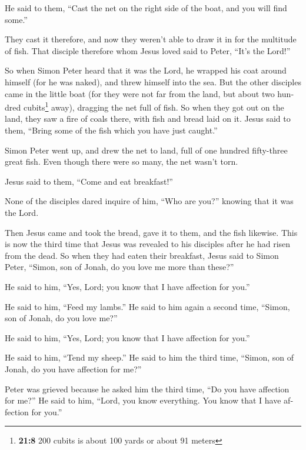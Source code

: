 \begin{paracol}{2}
\begin{otherlanguage}{english}
 He said to them, ``Cast the net on the right side of the
boat, and you will find some.''

They cast it therefore, and now they weren't able to draw it in for the
multitude of fish.  That disciple therefore whom Jesus
loved said to Peter, ``It's the Lord!''

So when Simon Peter heard that it was the Lord, he wrapped his coat
around himself (for he was naked), and threw himself into the sea.
 But the other disciples came in the little boat (for they
were not far from the land, but about two hundred cubits\footnote{\textbf{21:8}
  200 cubits is about 100 yards or about 91 meters} away), dragging the
net full of fish.  So when they got out on the land, they
saw a fire of coals there, with fish and bread laid on it.
 Jesus said to them, ``Bring some of the fish which you
have just caught.''

 Simon Peter went up, and drew the net to land, full of
one hundred fifty-three great fish. Even though there were so many, the
net wasn't torn.

 Jesus said to them, ``Come and eat breakfast!''

None of the disciples dared inquire of him, ``Who are you?'' knowing
that it was the Lord.

 Then Jesus came and took the bread, gave it to them, and
the fish likewise.  This is now the third time that Jesus
was revealed to his disciples after he had risen from the dead.
 So when they had eaten their breakfast, Jesus said to
Simon Peter, ``Simon, son of Jonah, do you love me more than these?''

He said to him, ``Yes, Lord; you know that I have affection for you.''

He said to him, ``Feed my lambs.''  He said to him again
a second time, ``Simon, son of Jonah, do you love me?''

He said to him, ``Yes, Lord; you know that I have affection for you.''

He said to him, ``Tend my sheep.''  He said to him the
third time, ``Simon, son of Jonah, do you have affection for me?''

Peter was grieved because he asked him the third time, ``Do you have
affection for me?'' He said to him, ``Lord, you know everything. You
know that I have affection for you.''


\end{otherlanguage}
\end{paracol}

